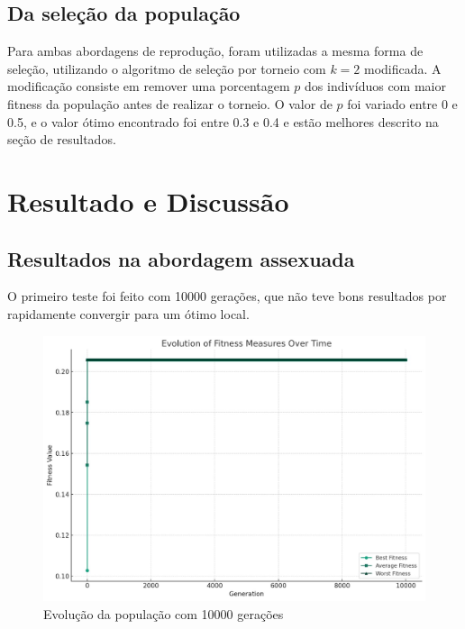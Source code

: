 \documentclass[12pt]{article}
\begin{document}
\subsection{Da seleção da população}
Para ambas abordagens de reprodução, foram utilizadas a mesma forma de seleção, utilizando o algoritmo de seleção por torneio com \(k=2\) modificada. A modificação consiste em remover uma porcentagem \(p\) dos indivíduos com maior fitness da população antes de realizar o torneio. O valor de \(p\) foi variado entre 0 e 0.5, e o valor ótimo encontrado foi entre 0.3 e 0.4 e estão melhores descrito na seção de resultados.
\section{Resultado e Discussão}

\subsection{Resultados na abordagem assexuada}
O primeiro teste foi feito com 10000 gerações, que não teve bons resultados por rapidamente convergir para um ótimo local.

\begin{figure}[h]
    \centering
    \includegraphics[width=0.5\linewidth]{1tentativa.png}
    \caption{Evolução da população com 10000 gerações}
    \label{fig:first-attempt}
\end{figure}
\end{document}
